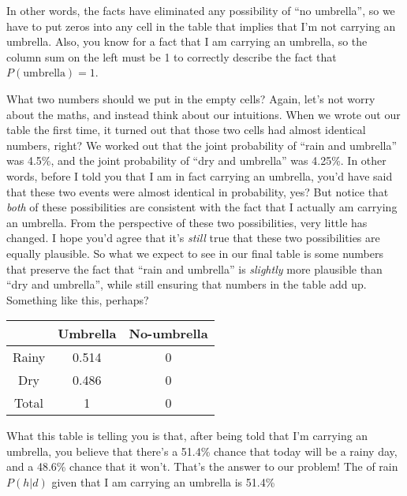 \noindent
In other words, the facts have eliminated any possibility of ``no umbrella'', so we have to put zeros into any cell in the table that implies that I'm not carrying an umbrella. Also, you know for a fact that I am carrying an umbrella, so the column sum on the left must be 1 to correctly describe the fact that $P(\mbox{umbrella})=1$.

What two numbers should we put in the empty cells? Again, let's not worry about the maths, and instead think about our intuitions. When we wrote out our table the first time, it turned out that those two cells had almost identical numbers, right? We worked out that the joint probability of ``rain and umbrella'' was 4.5\%, and the joint probability of ``dry and umbrella'' was 4.25\%. In other words, before I told you that I am in fact carrying an umbrella, you'd have said that these two events were almost identical in probability, yes? But notice that {\it both} of these possibilities are consistent with the fact that I actually am carrying an umbrella. From the perspective of these two possibilities, very little has changed. I hope you'd agree that it's {\it still} true that these two possibilities are equally plausible. So what we expect to see in our final table is some numbers that preserve the fact that ``rain and umbrella'' is {\it slightly} more plausible than ``dry and umbrella'', while still ensuring that numbers in the table add up. Something like this, perhaps?

\begin{center}
\begin{tabular}{c|cc}
& Umbrella & No-umbrella  \\ \hline
Rainy & 0.514 & 0   \\
Dry & 0.486 & 0    \\ \hline
Total & 1 & 0 
\end{tabular}
\end{center}

\noindent
What this table is telling you is that, after being told that I'm carrying an umbrella, you believe that there's a 51.4\% chance that today will be a rainy day, and a 48.6\% chance that it won't. That's the answer to our problem! The  of rain $P(h|d)$ given that I am carrying an umbrella is 51.4\%

